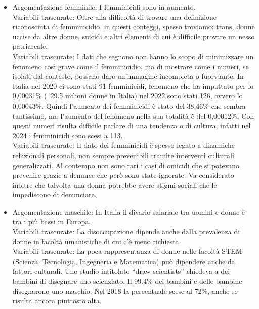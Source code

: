 \documentclass[12pt]{book} %
\begin{document}
\begin{mdframed}[linewidth=1pt]
\begin{itemize}
\item Argomentazione femminile: I femminicidi sono in aumento.
\\Variabili trascurate: Oltre alla difficoltà di trovare una definizione riconosciuta di femminicidio, in questi conteggi, spesso troviamo: trans, donne uccise da altre donne, suicidi e altri elementi di cui è difficile provare un nesso patriarcale.
\\Variabili trascurate: I dati che seguono non hanno lo scopo di minimizzare un fenomeno così grave come il femminicidio, ma di mostrare come i numeri, se isolati dal contesto, possano dare un’immagine incompleta o fuorviante.
In Italia nel 2020 ci sono stati 91 femminicidi, fenomeno che ha impattato per lo 0,00031\% (~29.5 milioni donne in Italia) nel 2022 sono stati 126, ovvero lo 0,00043\%. Quindi l'aumento dei femminicidi è stato del 38,46\% che sembra tantissimo, ma l'aumento del fenomeno nella sua totalità è del 0,00012\%. Con questi numeri risulta difficile parlare di una tendenza o di cultura, infatti nel 2024 i femminicidi sono scesi a 113.
\\Variabili trascurate: Il dato dei femminicidi è spesso legato a dinamiche relazionali personali, non sempre prevenibili tramite interventi culturali generalizzati. Al contempo non sono rari i casi di omicidi che si potevano prevenire grazie a denunce che però sono state ignorate. Va considerato inoltre che talvolta una donna potrebbe avere stigmi sociali che le impediscono di denunciare. 
\item Argomentazione maschile: In Italia il divario salariale tra uomini e donne è tra i più bassi in Europa.
\\Variabili trascurate: La disoccupazione dipende anche dalla prevalenza di donne in facoltà umanistiche di cui c'è meno richiesta.
\\Variabili trascurate: La poca rappresentanza di donne nelle facoltà STEM (Scienza, Tecnologia, Ingegneria e Matematica) può dipendere anche da fattori culturali. Uno studio intitolato “draw scientists” chiedeva a dei bambini di disegnare uno scienziato. Il 99.4\% dei bambini e delle bambine disegnarono uno maschio. Nel 2018 la percentuale scese al 72\%, anche se risulta ancora piuttosto alta.

\end{itemize}
\end{mdframed}
\end{document}
